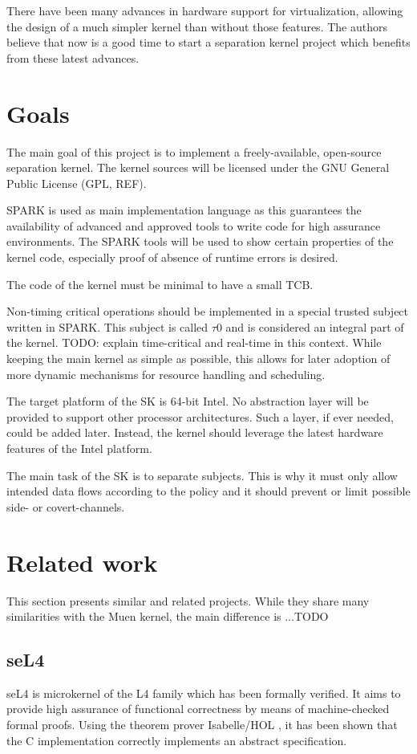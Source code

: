 There have been many advances in hardware support for virtualization, allowing
the design of a much simpler kernel than without those features. The authors
believe that now is a good time to start a separation kernel project which
benefits from these latest advances.

\section{Goals}
The main goal of this project is to implement a freely-available, open-source
separation kernel. The kernel sources will be licensed under the GNU General
Public License (GPL, REF).

SPARK is used as main implementation language as this guarantees the
availability of advanced and approved tools to write code for high assurance
environments. The SPARK tools will be used to show certain properties of the
kernel code, especially proof of absence of runtime errors is desired.

The code of the kernel must be minimal to have a small TCB.

Non-timing critical operations should be implemented in a special trusted
subject written in SPARK. This subject is called $\tau$0 and is considered an
integral part of the kernel. TODO: explain time-critical and real-time in this
context. While keeping the main kernel as simple as possible, this allows for
later adoption of more dynamic mechanisms for resource handling and scheduling.

The target platform of the SK is 64-bit Intel. No abstraction layer will be
provided to support other processor architectures. Such a layer, if ever needed,
could be added later. Instead, the kernel should leverage the latest hardware
features of the Intel platform.

The main task of the SK is to separate subjects. This is why it must only allow
intended data flows according to the policy and it should prevent or limit
possible side- or covert-channels.

\section{Related work}
This section presents similar and related projects. While they share many
similarities with the Muen kernel, the main difference is ...TODO

\subsection{seL4}
seL4 is microkernel of the L4 \cite{Liedtke:1996:TRM:234215.234473} family which
has been formally verified. It aims to provide high assurance of functional
correctness by means of machine-checked formal proofs. Using the theorem prover
Isabelle/HOL \cite{Nipkow-Paulson-Wenzel:2002}, it has been shown that the C
implementation correctly implements an abstract specification.

